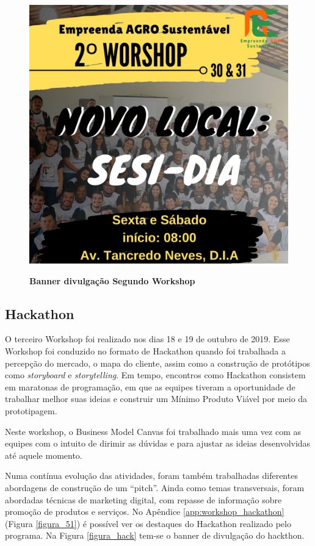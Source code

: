\begin{figure}[H]
\centering
\caption{\textbf{Banner divulgação Segundo Workshop}}
\includegraphics[scale=0.23]{Imagens/2_workshop.jpg}
\label{fig:ods}
\end{figure}

\subsection{Hackathon}

O terceiro Workshop foi realizado nos dias 18 e 19 de outubro de 2019. Esse Workshop foi conduzido no formato de Hackathon quando foi trabalhada a percepção do mercado, o mapa do cliente, assim como a construção de protótipos como \textit{storyboard} e \textit{storytelling}. Em tempo, encontros como Hackathon consistem em maratonas de programação, em que as equipes tiveram a oportunidade de trabalhar melhor suas ideias e construir um Mínimo Produto Viável por meio da prototipagem.

Neste workshop, o Business Model Canvas foi trabalhado mais uma vez com as equipes com o intuito de dirimir as dúvidas e para ajustar as ideias desenvolvidas até aquele momento.

Numa contínua evolução das atividades, foram também trabalhadas diferentes abordagens de construção de um “pitch”. Ainda como temas transversais, foram abordadas técnicas de marketing digital, com repasse de informação sobre promoção de produtos e serviços. No Apêndice \ref{app:workshop_hackathon} (Figura \ref{figura_51}) é possível ver os destaques do Hackathon realizado pelo programa. Na Figura \ref{figura_hack} tem-se o banner de divulgação do hackthon.

